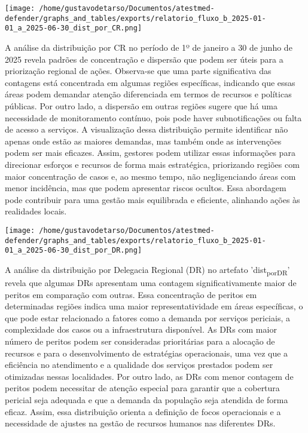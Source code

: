 \documentclass[11pt]{article}
\begin{document}
\begin{center}
\texttt{[image: /home/gustavodetarso/Documentos/atestmed-defender/graphs\_and\_tables/exports/relatorio\_fluxo\_b\_2025-01-01\_a\_2025-06-30\_dist\_por\_CR.png]}
\end{center}
A análise da distribuição por CR no período de 1º de janeiro a 30 de junho de 2025 revela padrões de concentração e dispersão que podem ser úteis para a priorização regional de ações. Observa-se que uma parte significativa das contagens está concentrada em algumas regiões específicas, indicando que essas áreas podem demandar atenção diferenciada em termos de recursos e políticas públicas. Por outro lado, a dispersão em outras regiões sugere que há uma necessidade de monitoramento contínuo, pois pode haver subnotificações ou falta de acesso a serviços. A visualização dessa distribuição permite identificar não apenas onde estão as maiores demandas, mas também onde as intervenções podem ser mais eficazes. Assim, gestores podem utilizar essas informações para direcionar esforços e recursos de forma mais estratégica, priorizando regiões com maior concentração de casos e, ao mesmo tempo, não negligenciando áreas com menor incidência, mas que podem apresentar riscos ocultos. Essa abordagem pode contribuir para uma gestão mais equilibrada e eficiente, alinhando ações às realidades locais.
\begin{center}
\texttt{[image: /home/gustavodetarso/Documentos/atestmed-defender/graphs\_and\_tables/exports/relatorio\_fluxo\_b\_2025-01-01\_a\_2025-06-30\_dist\_por\_DR.png]}
\end{center}
A análise da distribuição por Delegacia Regional (DR) no artefato 'dist\textsubscript{por}\textsubscript{DR}' revela que algumas DRs apresentam uma contagem significativamente maior de peritos em comparação com outras. Essa concentração de peritos em determinadas regiões indica uma maior representatividade em áreas específicas, o que pode estar relacionado a fatores como a demanda por serviços periciais, a complexidade dos casos ou a infraestrutura disponível. As DRs com maior número de peritos podem ser consideradas prioritárias para a alocação de recursos e para o desenvolvimento de estratégias operacionais, uma vez que a eficiência no atendimento e a qualidade dos serviços prestados podem ser otimizadas nessas localidades. Por outro lado, as DRs com menor contagem de peritos podem necessitar de atenção especial para garantir que a cobertura pericial seja adequada e que a demanda da população seja atendida de forma eficaz. Assim, essa distribuição orienta a definição de focos operacionais e a necessidade de ajustes na gestão de recursos humanos nas diferentes DRs.
\end{document}
